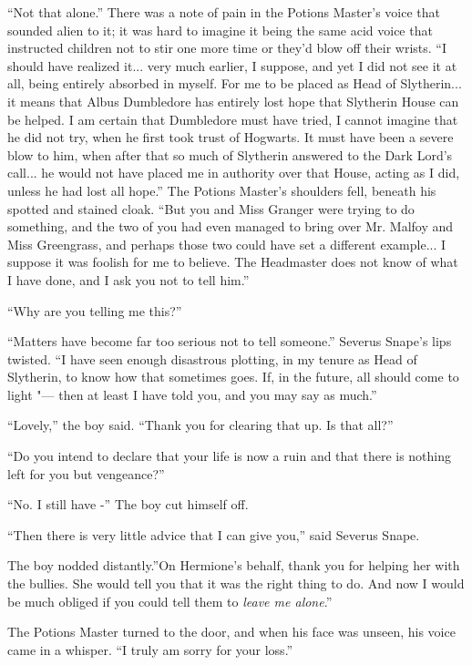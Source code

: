 ``Not that alone.'' There was a note of pain in the Potions Master's
voice that sounded alien to it; it was hard to imagine it being the same
acid voice that instructed children not to stir one more time or they'd
blow off their wrists. ``I should have realized it... very much
earlier, I suppose, and yet I did not see it at all, being entirely
absorbed in myself. For me to be placed as Head of Slytherin... it
means that Albus Dumbledore has entirely lost hope that Slytherin House
can be helped. I am certain that Dumbledore must have tried, I cannot
imagine that he did not try, when he first took trust of Hogwarts. It
must have been a severe blow to him, when after that so much of
Slytherin answered to the Dark Lord's call... he would not have
placed me in authority over that House, acting as I did, unless he had
lost all hope.'' The Potions Master's shoulders fell, beneath his
spotted and stained cloak. ``But you and Miss Granger were trying to do
something, and the two of you had even managed to bring over Mr. Malfoy
and Miss Greengrass, and perhaps those two could have set a different
example... I suppose it was foolish for me to believe. The
Headmaster does not know of what I have done, and I ask you not to tell
him.''

``Why are you telling me this?''

``Matters have become far too serious not to tell someone.'' Severus
Snape's lips twisted. ``I have seen enough disastrous plotting, in my
tenure as Head of Slytherin, to know how that sometimes goes. If, in the
future, all should come to light "--- then at least I have told you, and
you may say as much.''

``Lovely,'' the boy said. ``Thank you for clearing that up. Is that
all?''

``Do you intend to declare that your life is now a ruin and that there
is nothing left for you but vengeance?''

``No. I still have -'' The boy cut himself off.

``Then there is very little advice that I can give you,'' said Severus
Snape.

The boy nodded distantly.''On Hermione's behalf, thank you for helping
her with the bullies. She would tell you that it was the right thing to
do. And now I would be much obliged if you could tell them to
\emph{leave me alone}.''

The Potions Master turned to the door, and when his face was unseen, his
voice came in a whisper. ``I truly am sorry for your loss.''

